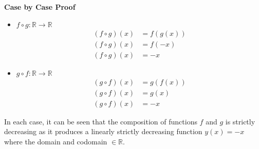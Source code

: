 \documentclass{article}
\begin{document}
\textbf{Case by Case Proof}

\begin{itemize}
	\item $ f \circ g: \mathbb{R} \rightarrow \mathbb{R} $
	      \begin{align*}
		      \left( f \circ g \right) \left( x \right) & = f(g(x)) \\
		      \left( f \circ g \right) \left( x \right) & = f(-x)   \\
		      \left( f \circ g \right) \left( x \right) & = -x
	      \end{align*}
	\item $ g \circ f: \mathbb{R} \rightarrow \mathbb{R} $
	      \begin{align*}
		      \left( g \circ f \right) \left( x \right) & = g(f(x)) \\
		      \left( g \circ f \right) \left( x \right) & = g(x)    \\
		      \left( g \circ f \right) \left( x \right) & = -x
	      \end{align*}
\end{itemize}
In each case, it can be seen that the composition of functions $ f $ and $ g $ is strictly decreasing as it produces a linearly strictly decreasing function $ y(x) = -x $ where the domain and codomain $ \in \mathbb{R} $.
\end{document}
